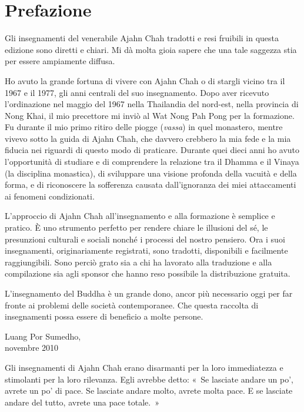 \chapter{Prefazione}

Gli insegnamenti del venerabile Ajahn Chah tradotti e resi fruibili in
questa edizione sono diretti e chiari. Mi dà molta gioia sapere che una
tale saggezza stia per essere ampiamente diffusa.

Ho avuto la grande fortuna di vivere con Ajahn Chah o di stargli vicino
tra il 1967 e il 1977, gli anni centrali del suo insegnamento. Dopo aver
ricevuto l'ordinazione nel maggio del 1967 nella Thailandia del
nord-est, nella provincia di Nong Khai, il mio precettore mi inviò al
Wat Nong Pah Pong per la formazione. Fu durante il mio primo ritiro
delle piogge (\emph{vassa}) in quel monastero, mentre vivevo sotto la
guida di Ajahn Chah, che davvero crebbero la mia fede e la mia fiducia
nei riguardi di questo modo di praticare. Durante quei dieci anni ho
avuto l'opportunità di studiare e di comprendere la relazione tra il
Dhamma e il Vinaya (la disciplina monastica), di sviluppare una visione
profonda della vacuità e della forma, e di riconoscere la sofferenza
causata dall'ignoranza dei miei attaccamenti ai fenomeni condizionati.

L'approccio di Ajahn Chah all'insegnamento e alla formazione è semplice
e pratico. È uno strumento perfetto per rendere chiare le illusioni del
sé, le presunzioni culturali e sociali nonché i processi del nostro
pensiero. Ora i suoi insegnamenti, originariamente registrati, sono
tradotti, disponibili e facilmente raggiungibili. Sono perciò grato sia
a chi ha lavorato alla traduzione e alla compilazione sia agli sponsor
che hanno reso possibile la distribuzione gratuita.

L'insegnamento del Buddha è un grande dono, ancor più necessario oggi
per far fronte ai problemi delle società contemporanee. Che questa
raccolta di insegnamenti possa essere di beneficio a molte persone.

\bigskip

{\raggedleft
  Luang Por Sumedho,\\
  novembre 2010
\par}

\clearpage

Gli insegnamenti di Ajahn Chah erano disarmanti per la loro immediatezza
e stimolanti per la loro rilevanza. Egli avrebbe detto: «~Se lasciate
andare un po', avrete un po' di pace. Se lasciate andare molto, avrete
molta pace. E se lasciate andare del tutto, avrete una pace totale.~»

